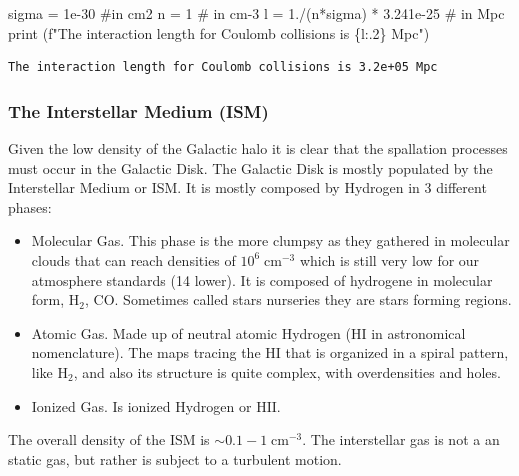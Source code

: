 \documentclass[
  letterpaper,
  DIV=11,
  numbers=noendperiod]{scrreprt}
\newenvironment{Shaded}{\begin{snugshade}}{\end{snugshade}}
\newcommand{\BuiltInTok}[1]{\textcolor[rgb]{0.00,0.23,0.31}{#1}}
\newcommand{\CommentTok}[1]{\textcolor[rgb]{0.37,0.37,0.37}{#1}}
\newcommand{\DecValTok}[1]{\textcolor[rgb]{0.68,0.00,0.00}{#1}}
\newcommand{\FloatTok}[1]{\textcolor[rgb]{0.68,0.00,0.00}{#1}}
\newcommand{\NormalTok}[1]{\textcolor[rgb]{0.00,0.23,0.31}{#1}}
\newcommand{\OperatorTok}[1]{\textcolor[rgb]{0.37,0.37,0.37}{#1}}
\newcommand{\SpecialCharTok}[1]{\textcolor[rgb]{0.37,0.37,0.37}{#1}}
\newcommand{\SpecialStringTok}[1]{\textcolor[rgb]{0.13,0.47,0.30}{#1}}
\begin{document}
\begin{Shaded}
\begin{Highlighting}[]
\NormalTok{sigma }\OperatorTok{=} \FloatTok{1e{-}30} \CommentTok{\#in cm2}
\NormalTok{n }\OperatorTok{=} \DecValTok{1} \CommentTok{\# in cm{-}3}
\NormalTok{l }\OperatorTok{=} \FloatTok{1.}\OperatorTok{/}\NormalTok{(n}\OperatorTok{*}\NormalTok{sigma) }\OperatorTok{*} \FloatTok{3.241e{-}25} \CommentTok{\# in Mpc}
\BuiltInTok{print}\NormalTok{ (}\SpecialStringTok{f"The interaction length for Coulomb collisions is }\SpecialCharTok{\{}\NormalTok{l}\SpecialCharTok{:.2\}}\SpecialStringTok{ Mpc"}\NormalTok{)}
\end{Highlighting}
\end{Shaded}

\begin{verbatim}
The interaction length for Coulomb collisions is 3.2e+05 Mpc
\end{verbatim}

\subsubsection{The Interstellar Medium
(ISM)}\label{the-interstellar-medium-ism}

Given the low density of the Galactic halo it is clear that the
spallation processes must occur in the Galactic Disk. The Galactic Disk
is mostly populated by the Interstellar Medium or ISM. It is mostly
composed by Hydrogen in 3 different phases:

\begin{itemize}
\item
  Molecular Gas. This phase is the more clumpsy as they gathered in
  molecular clouds that can reach densities of
  \(10^{6} \; \mathrm{cm}^{-3}\) which is still very low for our
  atmosphere standards (14 lower). It is composed of hydrogene in
  molecular form, \(\mathrm{H}_2\), \(\mathrm{CO}\). Sometimes called
  stars nurseries they are stars forming regions.
\item
  Atomic Gas. Made up of neutral atomic Hydrogen (HI in astronomical
  nomenclature). The maps tracing the \(\mathrm{HI}\) that is organized
  in a spiral pattern, like \(\mathrm{H}_2\), and also its structure is
  quite complex, with overdensities and holes.
\item
  Ionized Gas. Is ionized Hydrogen or \(\mathrm{HII}\).
\end{itemize}

The overall density of the ISM is \(\sim 0.1-1 \;\mathrm{cm}^{-3}\). The
interstellar gas is not a an static gas, but rather is subject to a
turbulent motion.
\end{document}
